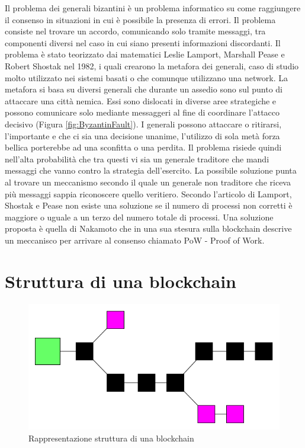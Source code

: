 \documentclass[11pt,a4paper,titlepage]{report}
\begin{document}
Il problema dei generali bizantini è un problema informatico su come raggiungere il consenso in situazioni in cui è possibile la presenza di errori. Il problema consiste nel trovare un accordo, comunicando solo tramite messaggi, tra componenti diversi nel caso in cui siano presenti informazioni discordanti. Il problema è stato teorizzato dai matematici Leslie Lamport, Marshall Pease e Robert Shostak nel 1982, i quali crearono la metafora dei generali, caso di studio molto utilizzato nei sistemi basati o che comunque utilizzano una network. La metafora si basa su diversi generali che durante un assedio sono sul punto di attaccare una città nemica. Essi sono dislocati in diverse aree strategiche e possono comunicare solo mediante messaggeri al fine di coordinare l'attacco decisivo (Figura \ref{fig:ByzantinFault}). I generali possono attaccare o ritirarsi, l'importante e che ci sia una decisione unanime, l'utilizzo di sola metà forza bellica porterebbe ad una sconfitta o una perdita. Il problema risiede quindi nell'alta probabilità che tra questi vi sia un generale traditore che mandi messaggi che vanno contro la strategia dell'esercito. La possibile soluzione punta al trovare un meccanismo secondo il quale un generale non traditore che riceva più messaggi sappia riconoscere quello veritiero. Secondo l'articolo di Lamport, Shostak e Pease non esiste una soluzione se il numero di processi non corretti è maggiore o uguale a un terzo del numero totale di processi. Una soluzione proposta è quella di Nakamoto che in una sua stesura sulla blockchain descrive un meccanisco per arrivare al consenso chiamato PoW - Proof of Work.

\section{Struttura di una blockchain}

\begin{figure}[h]
	\includegraphics[width=\textwidth]{bl1}
	\centering
	\caption{Rappresentazione struttura di una blockchain}
	\label{fig:blockchain1}
\end{figure}
\end{document}
